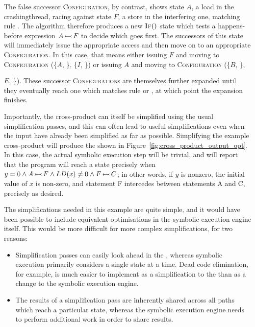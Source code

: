 The false successor \textsc{Configuration}, by contrast, shows state
$A$, a load in the \gls{crashingthread}, racing against state $F$, a
store in the interfering one, matching rule .  The
algorithm therefore produces a new $\stIf{}$ state which tests a
happens-before expression $A\,{\leftarrowtail}\,F$ to decide which
{\StateMachine} goes first.  The successors of this state will
immediately issue the appropriate access and then move on to an
appropriate \textsc{Configuration}.  In this case, that means either
issuing $F$ and moving to \textsc{Configuration} (\{$A$, {\false}\},
\{$I$, {\true}\}) or issuing $A$ and moving to \textsc{Configuration}
(\{$B$, {\true}\}, {$E$, {\false}\}).  These successor
  \textsc{Configuration}s are themselves further expanded until they
  eventually reach one which matches rule  or ,
  at which point the expansion finishes.

Importantly, the cross-product {\StateMachine} can itself be
simplified using the usual {\StateMachine} simplification passes, and
this can often lead to useful simplifications even when the input
{\StateMachines} have already been simplified as far as possible.
Simplifying the example cross-product {\StateMachine} will produce the
{\StateMachine} shown in Figure~\ref{fig:cross_product_output_opt}.
In this case, the actual symbolic execution step will be trivial, and
will report that the program will reach a {\stCrash} state precisely
when $y = 0 \wedge A\,{\leftarrowtail}\,F \wedge LD(x) \not= 0 \wedge
F\,{\leftarrowtail}\,C$; in other words, if $y$ is nonzero, the initial
value of $x$ is non-zero, and statement F intercedes between
statements A and C, precisely as desired.

The simplifications needed in this example are quite simple, and it
would have been possible to include equivalent optimisations in the
symbolic execution engine itself.  This would be more difficult for
more complex simplifications, for two reasons:

\begin{itemize}
\item Simplification passes can easily look ahead in the
  {\StateMachine}, whereas symbolic execution primarily considers a
  single state at a time.  Dead code elimination, for example, is much
  easier to implement as a simplification to the {\StateMachine} than
  as a change to the symbolic execution engine.
\item The results of a simplification pass are inherently shared
  across all paths which reach a particular state, whereas the
  symbolic execution engine needs to perform additional work in order
  to share results.
\end{itemize}

}
